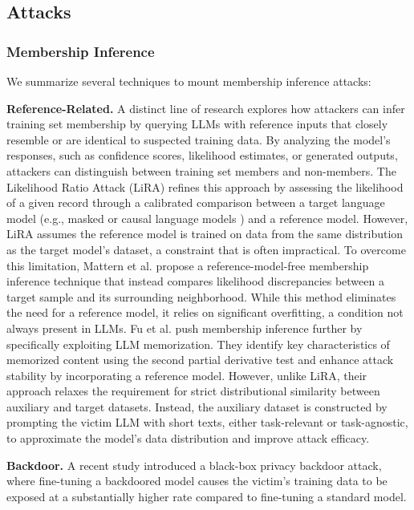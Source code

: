 \subsection{Attacks}

\subsubsection{Membership Inference}

We summarize several techniques to mount membership inference attacks:

\smallskip
\noindent
{\bf Reference-Related.} A distinct line of research explores how attackers can infer training set membership by querying LLMs with reference inputs that closely resemble or are identical to suspected training data. By analyzing the model’s responses, such as confidence scores, likelihood estimates, or generated outputs, attackers can distinguish between training set members and non-members. The Likelihood Ratio Attack (LiRA) \cite{mireshghallah_2022a} refines this approach by assessing the likelihood of a given record through a calibrated comparison between a target language model (e.g., masked or causal language models \cite{mireshghallah_2022b}) and a reference model. However, LiRA assumes the reference model is trained on data from the same distribution as the target model’s dataset, a constraint that is often impractical. To overcome this limitation, Mattern et al. \cite{mattern_2023a} propose a reference-model-free membership inference technique that instead compares likelihood discrepancies between a target sample and its surrounding neighborhood. While this method eliminates the need for a reference model, it relies on significant overfitting, a condition not always present in LLMs. Fu et al. \cite{fu_2023a} push membership inference further by specifically exploiting LLM memorization. They identify key characteristics of memorized content using the second partial derivative test and enhance attack stability by incorporating a reference model. However, unlike LiRA, their approach relaxes the requirement for strict distributional similarity between auxiliary and target datasets. Instead, the auxiliary dataset is constructed by prompting the victim LLM with short texts, either task-relevant or task-agnostic, to approximate the model’s data distribution and improve attack efficacy.

\smallskip
\noindent
{\bf Backdoor.} A recent study \cite{wen2024privacybackdoors} introduced a black-box privacy backdoor attack, where fine-tuning a backdoored model causes the victim's training data to be exposed at a substantially higher rate compared to fine-tuning a standard model.

